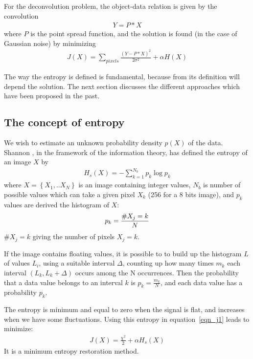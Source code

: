 For the deconvolution problem, the object-data relation is given by the
convolution
\begin{eqnarray}
Y = P * X
\end{eqnarray}
where $P$ is the point spread function, and the solution is found (in the case
of Gaussian noise) by minimizing
\begin{eqnarray}
J(X) = \sum_{pixels} \frac{{(Y-P*X)}^{2}}{2 {\sigma}^{2}} + {\alpha} H(X)
\end{eqnarray}

The way the entropy is defined is fundamental, because from its definition
will depend the solution. The next section discusses the different approaches 
which have been proposed in the past.

\clearpage
\newpage

\subsection{The concept of entropy}
\label{sect_entr}
We wish to estimate an unknown probability density $p(X)$ of the data.
 Shannon \cite{ima:shannon48}, in the framework of the information 
 theory, has defined the entropy of an image $X$ by 
\begin{eqnarray}
H_s(X) = - \sum_{k=1}^{N_b} p_k \log p_k
\end{eqnarray}
where  $X=\left\{X_1,.. X_N \right\}$ is an image 
containing integer values, $N_b$ is number of possible values which can 
take a given pixel $X_k$ 
(256 for a 8 bits image), and 
 $p_k$ values are derived the histogram of $X$:
\begin{eqnarray}
p_k = {  \mbox{\#} X_j = k \over  N} 
\end{eqnarray}
$\mbox{\#} X_j = k $ giving the number of pixels  $X_j = k$.

If the image contains floating values, it is possible to
to build up the histogram $L$ of values $L_i$, using
a suitable interval $\Delta$, counting up how many times $m_k$ each interval
$(L_k, L_k + \Delta)$ occurs among the N occurrences. Then the probability
that a data value belongs to an interval $k$ is $p_k = \frac{m_k}{N}$, and
each data value has a probability $p_k$.  

The entropy is minimum and equal to zero when the signal is flat, and
increases when we have some fluctuations. Using this entropy in 
equation~\ref{eqn_j1} leads to minimize:
\begin{eqnarray}
J(X) = \frac{{\chi}^2}{2} + {\alpha} H_s(X)
\label{eqn_j2}
\end{eqnarray}
It is a minimum entropy restoration method.
 
